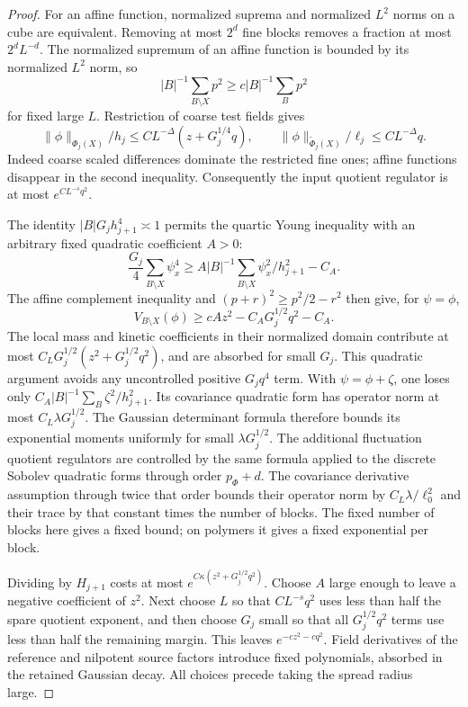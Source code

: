 \documentclass[11pt]{article}
\begin{document}
\begin{proof}
For an affine function, normalized suprema and normalized \(L^2\)
norms on a cube are equivalent. Removing at most \(2^d\) fine blocks
removes a fraction at most \(2^dL^{-d}\). The normalized supremum of
an affine function is bounded by its normalized \(L^2\) norm, so
\[
 |B|^{-1}\sum_{B\setminus X}p^2\ge c|B|^{-1}\sum_Bp^2
\]
for fixed large \(L\). Restriction of coarse test fields gives
\[
 \|\phi\|_{\Phi_j(X)}/h_j
 \le C L^{-\Delta}(z+G_j^{1/4}q),\qquad
 \|\phi\|_{\widetilde\Phi_j(X)}/\ell_j
 \le C L^{-\Delta}q.
\]
Indeed coarse scaled differences dominate the restricted fine ones;
affine functions disappear in the second inequality. Consequently the
input quotient regulator is at most \(e^{CL^{-s}q^2}\).

The identity \(|B|G_jh_{j+1}^4\asymp1\) permits the quartic Young
inequality with an arbitrary fixed quadratic coefficient \(A>0\):
\[
 \frac{G_j}{4}\sum_{B\setminus X}\psi_x^4
 \ge A|B|^{-1}\sum_{B\setminus X}\psi_x^2/h_{j+1}^2-C_A.
\]
The affine complement inequality and \((p+r)^2\ge p^2/2-r^2\)
then give, for \(\psi=\phi\),
\[
 V_{B\setminus X}(\phi)
       \ge cA z^2-C_A G_j^{1/2}q^2-C_A.
\]
The local mass and kinetic coefficients in their normalized domain
contribute at most \(C_LG_j^{1/2}(z^2+G_j^{1/2}q^2)\), and are
absorbed for small \(G_j\). This quadratic argument avoids any
uncontrolled positive \(G_jq^4\) term.
With \(\psi=\phi+\zeta\), one loses only
\(C_A|B|^{-1}\sum_B\zeta^2/h_{j+1}^2\). Its covariance quadratic
form has operator norm at most \(C_L\lambda G_j^{1/2}\).
The Gaussian determinant formula therefore bounds its exponential
moments uniformly for small \(\lambda G_j^{1/2}\).
The additional fluctuation quotient regulators are controlled by the
same formula applied to the discrete Sobolev quadratic forms through
order \(p_\Phi+d\). The covariance derivative assumption through twice
that order bounds their operator norm by \(C_L\lambda/\ell_0^2\)
and their trace by that constant times the number of blocks. The fixed
number of blocks here gives a fixed bound; on polymers it gives a fixed
exponential per block.

Dividing by \(H_{j+1}\) costs at most
\(e^{C\kappa(z^2+G_j^{1/2}q^2)}\). Choose \(A\) large enough to
leave a negative coefficient of \(z^2\). Next choose \(L\) so that
\(CL^{-s}q^2\) uses less than half the spare quotient exponent, and
then choose \(G_j\) small so that all \(G_j^{1/2}q^2\) terms use less
than half the remaining margin. This leaves
\(e^{-cz^2-cq^2}\). Field derivatives of the reference and nilpotent
source factors introduce fixed polynomials, absorbed in the retained
Gaussian decay. All choices precede taking the spread radius large.
\end{proof}
\end{document}
